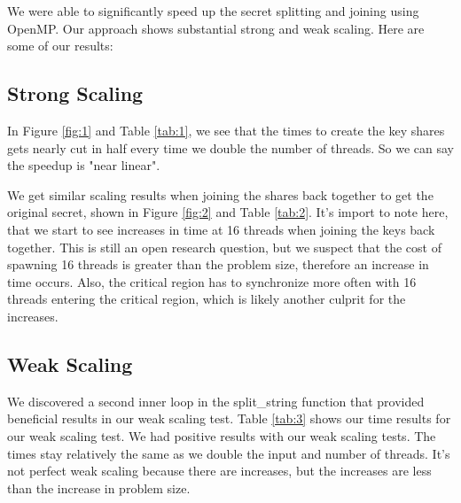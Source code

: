 \documentclass[main.tex]{subfiles}
\begin{document}
\indent We were able to significantly speed up the secret splitting and joining using OpenMP. Our approach shows substantial strong and weak scaling. Here are some of our results: 

\subsection{Strong Scaling}

\indent In Figure \ref{fig:1} and Table \ref{tab:1}, we see that the times to create the key shares gets nearly cut in half every time we double the number of threads. So we can say the speedup is "near linear".


\indent We get similar scaling results when joining the shares back together to get the original secret, shown in Figure \ref{fig:2} and Table \ref{tab:2}.  It's import to note here, that we start to see increases in time at 16 threads when joining the keys back together.  This is still an open research question, but we suspect that the cost of spawning 16 threads is greater than the problem size, therefore an increase in time occurs.  Also, the critical region has to synchronize more often with 16 threads entering the critical region, which is likely another culprit for the increases.


\subsection{Weak Scaling}

\indent We discovered a second inner loop in the split\_string function that provided beneficial results in our weak scaling test.  Table \ref{tab:3} shows our time results for our weak scaling test.  We had positive results with our weak scaling tests. The times stay relatively the same as we double the input and number of threads. It's not perfect weak scaling because there are increases, but the increases are less than the increase in problem size.

\end{document}
